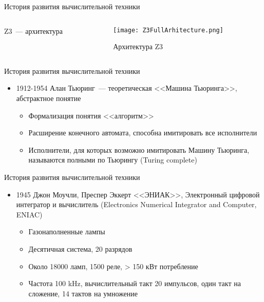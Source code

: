 \documentclass[aspectratio=169,14pt]{beamer}
\begin{document}
\begin{frame}{История развития вычислительной техники}
    \begin{columns}[onlytextwidth]
        \begin{column}{0.3\textwidth}
            Z3~--- архитектура
        \end{column}
        \begin{column}{0.7\textwidth}
            \begin{figure}[htp]
                \centering
                \texttt{[image: Z3FullArhitecture.png]}
                \caption{\tiny{Архитектура Z3}}
                \label{fig:Z3FullArhitecture}
            \end{figure}
        \end{column}
    \end{columns}
\end{frame}

\begin{frame}{История развития вычислительной техники}
    \begin{itemize}
        \item 1912-1954 Алан Тьюринг~--- теоретическая <<Машина Тьюринга>>, абстрактное понятие
        \begin{itemize}
            \item Формализация понятия <<алгоритм>>
            \item Расширение конечного автомата, способна имитировать все исполнители
            \item Исполнители, для которых возможно имитировать
            Машину Тьюринга, называются полными по Тьюрингу (Turing complete)
        \end{itemize}
    \end{itemize}
\end{frame}

\begin{frame}{История развития вычислительной техники}
    \begin{itemize}
        \item 1945 Джон Моучли, Преспер Эккерт <<ЭНИАК>>, Электронный цифровой
        интегратор и вычислитель (Electronics Numerical Integrator and Computer, ENIAC)
        \begin{itemize}
            \item Газонаполненные лампы
            \item Десятичная система, 20 разрядов
            \item Около 18000 ламп, 1500 реле, > 150 кВт потребление
            \item Частота 100 kHz, вычислительный такт 20 импульсов,
            один такт на сложение, 14 тактов на умножение
        \end{itemize}
    \end{itemize}
\end{frame}
\end{document}
